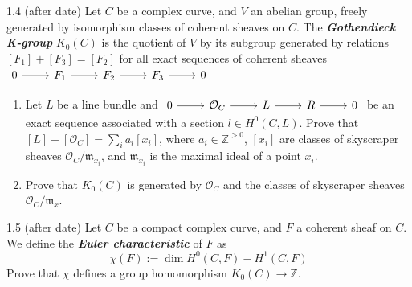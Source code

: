 \begin{manualexercise}{1.4 (after date)}
	Let $C$ be a complex curve, and $V$ an abelian group, freely generated by isomorphism classes of coherent sheaves on $C$. The \textit{\textbf{Gothendieck K-group}} $K_0(C)$ is the quotient of $V$ by its subgroup generated by relations $[F_1]+[F_3]=[F_2]$ for all exact sequences of coherent sheaves $\begin{tikzcd}
		0\arrow[r]&F_1\arrow[r]&F_2\arrow[r]&F_3\arrow[r]&0
	\end{tikzcd}$
	\begin{enumerate}[label=\alph*.]
		\item Let $L$ be a line bundle and $\begin{tikzcd}
			0\arrow[r]&\mathcal{O}_C\arrow[r]&L\arrow[r]&R\arrow[r]&0
		\end{tikzcd}$ be an exact sequence associated with a section $l \in H^{0}(C,L)$. Prove that $[L]-[\mathcal{O}_C]=\sum_{i}a_i[x_i]$, where $a_i\in\mathbb{Z}^{>0}$, $[x_i]$ are classes of skyscraper sheaves $\mathcal{O}_C/\mathfrak{m}_{x_i}$, and $\mathfrak{m}_{x_i}$ is the maximal ideal of a point $x_i$.
	
	\item Prove that $K_0(C)$ is generated by $\mathcal{O}_C$ and the classes of skyscraper sheaves $\mathcal{O}_C/\mathfrak{m}_{x}$.
	\end{enumerate}
\end{manualexercise}

\begin{manualexercise}{1.5 (after date)}
	Let $C$ be a compact complex curve, and $F$ a coherent sheaf on  $C$. We define the \textit{\textbf{Euler characteristic}} of $F$ as
	\[\chi(F):=\dim H^{0}(C,F)-H^{1}(C,F)\]
	Prove that $\chi$ defines a group homomorphism $K_0(C)\to \mathbb{Z}$.
\end{manualexercise}


